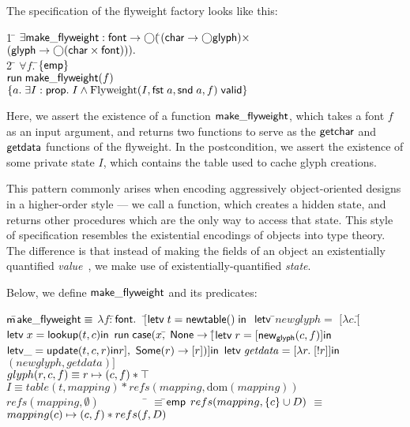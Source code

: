 The specification of the flyweight factory looks like this:


\begin{tabbing}
1 \qquad \= $\exists \mathsf{make\_flyweight} :
\mathsf{font} \to \bigcirc($\=$(\mathsf{char} \to \bigcirc{\mathsf{glyph}}) \times$ \\
\> \> $(\mathsf{glyph} \to \bigcirc{(\mathsf{char}\times \mathsf{font})})).$\\
2 \> \;\;\= $\forall f.\;$\=$\{{\mathsf{emp}}\}$ \\
  \>\> \> $\mathsf{run}\;{\mathsf{make\_flyweight}(f)}$ \\
  \>\> \> $\{{a.\; \exists I:\mathsf{prop}.\; I \land {\mbox{Flyweight}(I, \mathsf{fst}\; a, \mathsf{snd}\; a, f)}\;\mathsf{valid}}\}$ \\
\end{tabbing}


Here, we assert the existence of a function $\mathsf{make\_flyweight}$,
which takes a font $f$ as an input argument, and returns two functions
to serve as the $\mathsf{getchar}$ and $\mathsf{getdata}$ functions of
the flyweight. In the postcondition, we assert the existence of some
private state $I$, which contains the table used to cache glyph
creations. 

This pattern commonly arises when encoding aggressively
object-oriented designs in a higher-order style --- we call a
function, which creates a hidden state, and returns other procedures
which are the only way to access that state. This style of
specification resembles the existential encodings of objects into type
theory. The difference is that instead of making the fields of an
object an existentially quantified \emph{value}~\cite{pierce-turner}, we
make use of existentially-quantified \emph{state}.

Below, we define $\mathsf{make\_flyweight}$ and its predicates:


\begin{specification}
\nextline $\mathsf{m}$\=$\mathsf{ake\_flyweight} \equiv$ 
\nextline            \> $\lambda f:$\=$\mathsf{font}.\;$
\nextline \> $[$\=$\mathsf{letv}\;t = \mathsf{newtable}()\;\mathsf{in}\;$ 
\nextline \> \> $\mathsf{letv\;}$\=$\mathit{newglyph} =$ 
\nextline \> \> \> \!\!$[\lambda c.[$\=$\mathsf{letv}\; x = \mathsf{lookup}(t, c)\mathsf{ in}$
\nextline \> \>\>\> $\mathsf{run}\;\mathsf{case}(x,$\=
$\mathsf{None} \to [$\=$\mathsf{letv}\; r = [\mathsf{new}_{\mathsf{glyph}}(c,f)] \mathsf{ in}$
\nextline \> \>\>\>\>\> $\mathsf{letv } \_ = \mathsf{update}(t, c, r) \mathsf{ in }r],$ 
\nextline \> \>\>\>\> $\mathsf{Some}(r) \to [r])] \mathsf{ in}$ 
\nextline \> \> $\mathsf{letv\;}\mathit{getdata} = [\lambda r.\; [!r]] \mathsf{ in}$ 
\nextline \> \> $(\mathit{newglyph}, \mathit{getdata})]$
\\

\nextline $glyph(r, c, f) \equiv r \mapsto (c,f) * \top$ \\

\nextline $I \equiv table(t,mapping) * refs(mapping, \mbox{dom}(mapping))$ \\

\nextline $refs(mapping, \emptyset) \qquad\qquad  $ \= $\equiv$\;\;\=$\mathsf{emp}$ 
\nextline $refs(mapping, \{{c}\} \cup D)$ \> $\equiv$\> $mapping(c) \mapsto (c,f) * refs(f, D)$ 
\end{specification}


